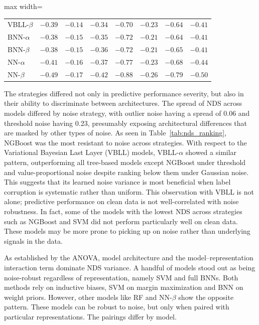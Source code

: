\begin{table}[htbp]
\begin{adjustbox}{max width=\textwidth}
\begin{tabular}{lccccccc}
VBLL-$\beta$        & $-0.39$ & $-0.14$ & $-0.34$ & $-0.70$ & $-0.23$ & $-0.64$ & $-0.41$ \\
BNN-$\alpha$        & $-0.38$ & $-0.15$ & $-0.35$ & $-0.72$ & $-0.21$ & $-0.64$ & $-0.41$ \\
BNN-$\beta$         & $-0.38$ & $-0.15$ & $-0.36$ & $-0.72$ & $-0.21$ & $-0.65$ & $-0.41$ \\
NN-$\alpha$         & $-0.41$ & $-0.16$ & $-0.37$ & $-0.77$ & $-0.23$ & $-0.68$ & $-0.44$ \\
NN-$\beta$          & $-0.49$ & $-0.17$ & $-0.42$ & $-0.88$ & $-0.26$ & $-0.79$ & $-0.50$ \\
\bottomrule
\end{tabular}
\end{adjustbox}
\end{table}

The strategies differed not only in predictive performance severity, but also in their ability to discriminate between architectures. The spread of NDS across models differed by noise strategy, with outlier noise having a spread of 0.06 and threshold noise having 0.23, presumably exposing architectural differences that are masked by other types of noise. As seen in Table~\ref{tab:nds_ranking}, NGBoost was the most resistant to noise across strategies. With respect to the Variational Bayesian Last Layer (VBLL) models, VBLL-$\alpha$ showed a similar pattern, outperforming all tree-based models except NGBoost under threshold and value-proportional noise despite ranking below them under Gaussian noise. This suggests that its learned noise variance is most beneficial when label corruption is systematic rather than uniform. This observation with VBLL is not alone; predictive performance on clean data is not well-correlated with noise robustness. In fact, some of the models with the lowest NDS across strategies such as NGBoost and SVM did not perform particularly well on clean data. These models may be more prone to picking up on noise rather than underlying signals in the data. 

As established by the ANOVA, model architecture and the model--representation interaction term dominate NDS variance. A handful of models stood out as being noise-robust regardless of representation, namely SVM and full BNNs. Both methods rely on inductive biases, SVM on margin maximization and BNN on weight priors. However, other models like RF and NN-$\beta$ show the opposite pattern. These models can be robust to noise, but only when paired with particular representations. The pairings differ by model. 

